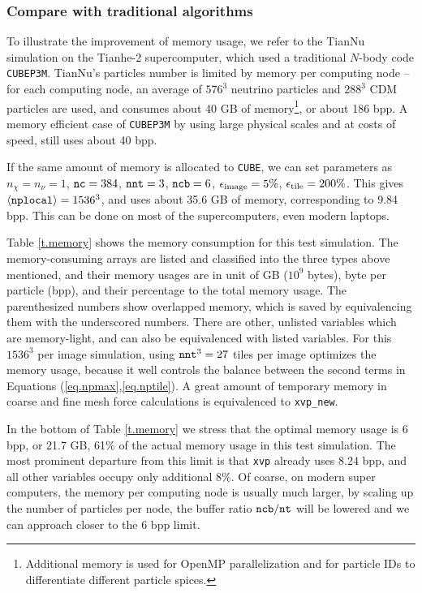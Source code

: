 \documentclass[10pt,twocolumn,preprint]{emulateapj}
\begin{document}
\subsubsection{Compare with traditional algorithms}
To illustrate the improvement of memory usage, we refer to the TianNu simulation \citep{2017NatAs...1E.143Y} on the Tianhe-2 supercomputer, which used a traditional $N$-body code {\tt CUBEP3M}. TianNu's particles number is limited by memory per computing node -- for each computing node, an average of $576^3$ neutrino particles and $288^3$ CDM particles are used, and consumes about 40 GB of memory\footnote{Additional memory is used for OpenMP parallelization and for particle IDs to differentiate different particle spices.}, or about 186 bpp. A memory efficient case of {\tt CUBEP3M} by using large physical scales and at costs of speed, still uses about 40 bpp. 

If the same amount of memory is allocated to {\tt CUBE}, we can set parameters as $n_\chi=n_\nu=1$, ${\tt nc}=384$, ${\tt nnt}=3$, ${\tt ncb}=6$, $\epsilon_{\rm image}=5\%$, $\epsilon_{\rm tile}=200\%$. This gives $\left\langle {\tt nplocal} \right\rangle=1536^3$, and uses about 35.6 GB of memory, corresponding to 9.84 bpp. This can be done on most of the supercomputers, even modern laptops.

Table \ref{t.memory} shows the memory consumption for this test simulation. The memory-consuming arrays are listed and classified into the three types above mentioned, and their memory usages are in unit of GB ($10^9$ bytes), byte per particle (bpp), and their percentage to the total memory usage. The parenthesized numbers show overlapped memory, which is saved by equivalencing them with the underscored numbers. There are other, unlisted variables which are memory-light, and can also be equivalenced with listed variables. For this $1536^3$ per image simulation, using ${\tt nnt}^3=27$ tiles per image optimizes the memory usage, because it well controls the balance between the second terms in Equations (\ref{eq.npmax},\ref{eq.nptile}). A great amount of temporary memory in coarse and fine mesh force calculations is equivalenced to {\tt xvp\_new}.

In the bottom of Table \ref{t.memory} we stress that the optimal memory usage is 6 bpp, or 21.7 GB, 61\% of the actual memory usage in this test simulation. The most prominent departure from this limit is that {\tt xvp} already uses 8.24 bpp, and all other variables occupy only additional 8\%. Of coarse, on modern super computers, the memory per computing node is usually much larger, by scaling up the number of particles per node, the buffer ratio ${\tt ncb}/{\tt nt}$ will be lowered and we can approach closer to the 6 bpp limit.
\end{document}
